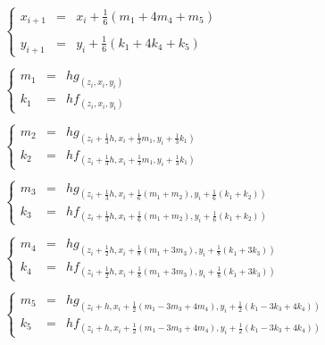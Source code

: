 \documentclass[11pt, a4paper]{article}
\begin{document}
\begin{equation}
    \begin{array}{l}
        \left\{\begin{array}{rcl}
            x_{i+1}&=&\displaystyle x_i+\frac{1}{6}\left(m_1+4m_4+m_5\right) \\\\
            y_{i+1}&=&\displaystyle y_i+\frac{1}{6}\left(k_1+4k_4+k_5\right)
        \end{array}\right. \\\\
        \left\{\begin{array}{rcl}
            m_1&=&hg_{\left(z_i, x_i, y_i\right)} \\
            k_1&=&hf_{\left(z_i, x_i, y_i\right)}
        \end{array}\right. \\\\
        \left\{\begin{array}{rcl}
            m_2&=&hg_{\left(z_i+\frac{1}{3}h, x_i+\frac{1}{3}m_1, y_i+\frac{1}{3}k_1\right)} \\
            k_2&=&hf_{\left(z_i+\frac{1}{3}h, x_i+\frac{1}{3}m_1, y_i+\frac{1}{3}k_1\right)}
        \end{array}\right. \\\\
        \left\{\begin{array}{rcl}
            m_3&=&hg_{\left(z_i+\frac{1}{3}h, x_i+\frac{1}{6}\left(m_1+m_2\right), y_i+\frac{1}{6}\left(k_1+k_2\right)\right)} \\
            k_3&=&hf_{\left(z_i+\frac{1}{3}h, x_i+\frac{1}{6}\left(m_1+m_2\right), y_i+\frac{1}{6}\left(k_1+k_2\right)\right)} 
        \end{array}\right. \\\\
        \left\{\begin{array}{rcl}
            m_4&=&hg_{\left(z_i+\frac{1}{2}h, x_i+\frac{1}{8}\left(m_1+3m_3\right), y_i+\frac{1}{8}\left(k_1+3k_3\right)\right)} \\
            k_4&=&hf_{\left(z_i+\frac{1}{2}h, x_i+\frac{1}{8}\left(m_1+3m_3\right), y_i+\frac{1}{8}\left(k_1+3k_3\right)\right)} 
        \end{array}\right. \\\\
        \left\{\begin{array}{rcl}
            m_5&=&hg_{\left(z_i+h, x_i+\frac{1}{2}\left(m_1-3m_3+4m_4\right), y_i+\frac{1}{2}\left(k_1-3k_3+4k_4\right)\right)} \\ 
            k_5&=&hf_{\left(z_i+h, x_i+\frac{1}{2}\left(m_1-3m_3+4m_4\right), y_i+\frac{1}{2}\left(k_1-3k_3+4k_4\right)\right)} 
        \end{array}\right.
    \end{array}
\end{equation}
\end{document}
